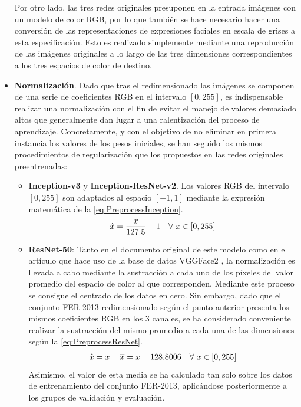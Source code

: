 \begin{itemize}
  Por otro lado, las tres redes originales presuponen en la entrada imágenes con un modelo de color RGB, por lo que también se hace necesario hacer una conversión de las representaciones de expresiones faciales en escala de grises a esta especificación. Esto es realizado simplemente mediante una reproducción de las imágenes originales a lo largo de las tres dimensiones correspondientes a los tres espacios de color de destino.
  \item \textbf{Normalización}. Dado que tras el redimensionado las imágenes se componen de una serie de coeficientes RGB en el intervalo $[0, 255]$, es indispensable realizar una normalización con el fin de evitar el manejo de valores demasiado altos que generalmente dan lugar a una ralentización del proceso de aprendizaje. Concretamente, y con el objetivo de no eliminar en primera instancia los valores de los pesos iniciales, se han seguido los mismos procedimientos de regularización que los propuestos en las redes originales preentrenadas:
        \begin{itemize}
            \item \textbf{Inception-v3} y \textbf{Inception-ResNet-v2}. Los valores RGB del intervalo $[0, 255]$ son adaptados al espacio $[-1, 1]$ mediante la expresión matemática de la \autoref{eq:PreprocessInception}.
                \begin{align} \label{eq:PreprocessInception}
                  \hat{x} &= \frac{x}{127.5} - 1 & \forall \text{\space} x \in [0, 255]
                \end{align}
            \item \textbf{ResNet-50}: Tanto en el documento original de este modelo \cite{ResNet} como en el artículo que hace uso de la base de datos VGGFace2 \cite{VGGFace2}, la normalización es llevada a cabo mediante la sustracción a cada uno de los píxeles del valor promedio del espacio de color al que corresponden. Mediante este proceso se consigue el centrado de los datos en cero. Sin embargo, dado que el conjunto FER-2013 redimensionado según el punto anterior presenta los mismos coeficientes RGB en los 3 canales, se ha considerado conveniente realizar la sustracción del mismo promedio a cada una de las dimensiones según la \autoref{eq:PreprocessResNet}.
                \begin{align} \label{eq:PreprocessResNet}
                  \hat{x} &= x - \overline{x} = x - 128.8006 & \forall \text{\space} x \in [0, 255]
                \end{align}
            Asimismo, el valor de esta media se ha calculado tan solo sobre los datos de entrenamiento del conjunto FER-2013, aplicándose posteriormente a los grupos de validación y evaluación. 
        \end{itemize}
        

\end{itemize}
